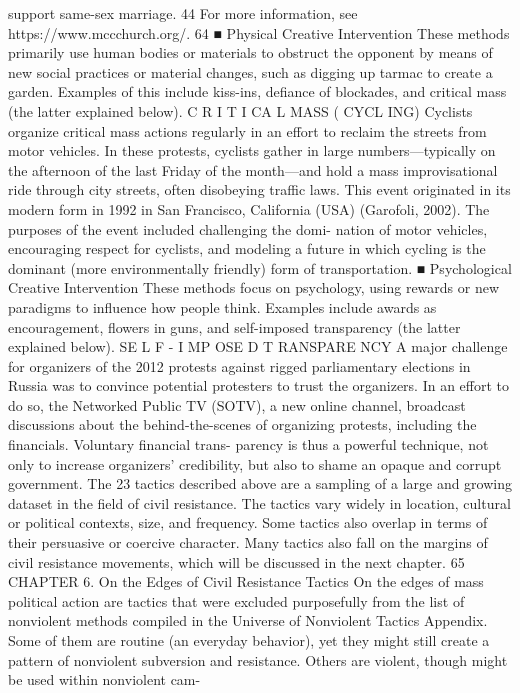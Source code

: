 \documentclass[twoside,a4paper,12pt,fleqn,openany]{extbook}
\begin{document}
support same-sex marriage.
44
For more information, see https://www.mccchurch.org/.
64
■ Physical Creative Intervention
These methods primarily use human bodies or materials to obstruct the opponent by means of
new social practices or material changes, such as digging up tarmac to create a garden. Examples
of this include kiss-ins, defiance of blockades, and critical mass (the latter explained below).
C R I T I CA L MASS ( CYCL ING)
Cyclists organize critical mass actions regularly in an effort to reclaim the streets from motor
vehicles. In these protests, cyclists gather in large numbers—typically on the afternoon of the
last Friday of the month—and hold a mass improvisational ride through city streets, often
disobeying traffic laws. This event originated in its modern form in 1992 in San Francisco,
California (USA) (Garofoli, 2002). The purposes of the event included challenging the domi-
nation of motor vehicles, encouraging respect for cyclists, and modeling a future in which
cycling is the dominant (more environmentally friendly) form of transportation.
■ Psychological Creative Intervention
These methods focus on psychology, using rewards or new paradigms to influence how
people think. Examples include awards as encouragement, flowers in guns, and self-imposed
transparency (the latter explained below).
SE L F - I MP OSE D T RANSPARE NCY
A major challenge for organizers of the 2012 protests against rigged parliamentary elections
in Russia was to convince potential protesters to trust the organizers. In an effort to do so,
the Networked Public TV (SOTV), a new online channel, broadcast discussions about the
behind-the-scenes of organizing protests, including the financials. Voluntary financial trans-
parency is thus a powerful technique, not only to increase organizers’ credibility, but also to
shame an opaque and corrupt government.
The 23 tactics described above are a sampling of a large and growing dataset in the
field of civil resistance. The tactics vary widely in location, cultural or political contexts, size,
and frequency. Some tactics also overlap in terms of their persuasive or coercive character.
Many tactics also fall on the margins of civil resistance movements, which will be discussed
in the next chapter.
65
CHAPTER 6. On the Edges of
Civil Resistance Tactics
On the edges of mass political action are tactics that were excluded purposefully from the
list of nonviolent methods compiled in the Universe of Nonviolent Tactics Appendix. Some
of them are routine (an everyday behavior), yet they might still create a pattern of nonviolent
subversion and resistance. Others are violent, though might be used within nonviolent cam-
\end{document}
